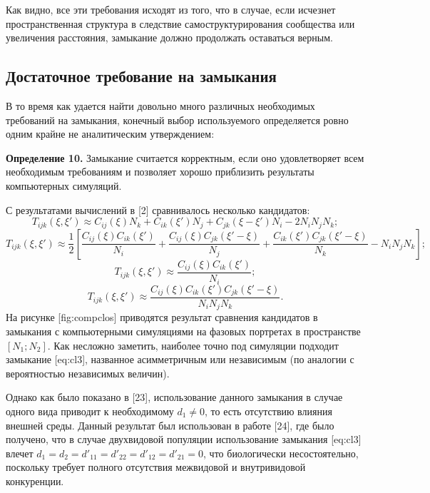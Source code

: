 Как видно, все эти требования исходят из того, что в случае, если исчезнет пространственная структура в следствие самоструктурирования сообщества или увеличения расстояния, замыкание должно продолжать оставаться верным.

\subsection{Достаточное требование на замыкания}

В то время как удается найти довольно много различных необходимых требований на замыкания, конечный выбор используемого определяется ровно одним крайне не аналитическим утверждением:

\textbf{Определение 10.} Замыкание считается корректным, если оно удовлетворяет всем необходимым требованиям и позволяет хорошо приблизить результаты компьютерных симуляций.

С результатами вычислений в [2] сравнивалось несколько кандидатов:
\begin{equation*}
T_{ijk}(\xi,\xi')\approx C_{ij}(\xi)N_{k}+C_{ik}(\xi')N_{j}+C_{jk}(\xi-\xi')N_{i}-2N_{i}N_{j}N_{k};
\end{equation*}
\begin{equation*}
T_{ijk}(\xi,\xi')\approx\frac{1}{2}\left[\frac{C_{ij}(\xi)C_{ik}(\xi')}{N_{i}}+\frac{C_{ij}(\xi)C_{jk}(\xi'-\xi)}{N_{j}}+\frac{C_{ik}(\xi')C_{jk}(\xi'-\xi)}{N_{k}}-N_{i}N_{j}N_{k}\right];
\end{equation*}
\begin{equation*}
T_{ijk}(\xi,\xi')\approx\frac{C_{ij}(\xi)C_{ik}(\xi')}{N_{i}};
\end{equation*}
\begin{equation*}
T_{ijk}(\xi,\xi')\approx\frac{C_{ij}(\xi)C_{ik}(\xi')C_{jk}(\xi'-\xi)}{N_{i}N_{j}N_{k}}.
\end{equation*}
На рисунке [fig:compclos] приводятся результат сравнения кандидатов в замыкания с компьютерными симуляциями на фазовых портретах в пространстве $ \left[N_{1};N_{2}\right] $. Как несложно заметить, наиболее точно под симуляции подходит замыкание [eq:cl3], названное асимметричным или независимым (по аналогии с вероятностью независимых величин).

Однако как было показано в [23], использование данного замыкания в случае одного вида приводит к необходимому $ d_{1}\ne0 $, то есть отсутствию влияния внешней среды. Данный результат был использован в работе [24], где было получено, что в случае двухвидовой популяции использование замыкания [eq:cl3] влечет $ d_{1}=d_{2}=d'_{11}=d'_{22}=d'_{12}=d'_{21}=0 $, что биологически несостоятельно, поскольку требует полного отсутствия межвидовой и внутривидовой конкуренции.

